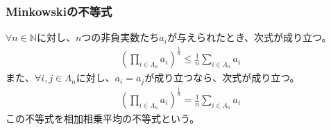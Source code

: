 \documentclass[dvipdfmx]{jsarticle}
\begin{document}
\subsubsection{Minkowskiの不等式}%
\begin{thm}[相加相乗平均の不等式]\label{2.3.1.4}
$\forall n \in \mathbb{N}$に対し、$n$つの非負実数たち$a_{i}$が与えられたとき、次式が成り立つ。
\begin{align*}
\left( \prod_{i \in \varLambda_{n}} a_{i} \right)^{\frac{1}{n}} \leq \frac{1}{n}\sum_{i \in \varLambda_{n}} a_{i}
\end{align*}
また、$\forall i,j \in \varLambda_{n}$に対し、$a_{i} = a_{j}$が成り立つなら、次式が成り立つ。
\begin{align*}
\left( \prod_{i \in \varLambda_{n}} a_{i} \right)^{\frac{1}{n}} = \frac{1}{n}\sum_{i \in \varLambda_{n}} a_{i}
\end{align*}
この不等式を相加相乗平均の不等式という。
\end{thm}
\end{document}
